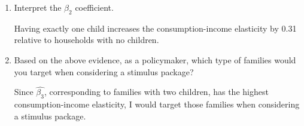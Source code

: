 \documentclass[11pt,twoside,openany]{memoir}
\begin{document}
\begin{question}
\begin{enumerate}[label = (\alph*),itemsep=1pt,topsep=3pt]
        \item Interpret the $\beta_2$ coefficient.
            {\color{blue} \begin{solution}
                Having exactly one child increases the consumption-income elasticity by 0.31 relative to households with no children.
            \end{solution}}

        \item Based on the above evidence, as a policymaker, which type of families would you target when considering a stimulus package?
            {\color{blue} \begin{solution}
                Since $\widehat{\beta_3}$, corresponding to families with two children, has the highest consumption-income elasticity, I would target those families when considering a stimulus package.
            \end{solution}}
    \end{enumerate}
\end{question}
\end{document}

